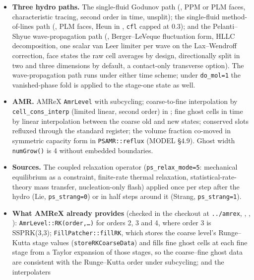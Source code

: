 \documentclass[11pt,a4paper]{article}
\newcommand{\code}[1]{\texttt{\small #1}}
\begin{document}
\begin{itemize}[nosep]
\item \textbf{Three hydro paths.}  The single-fluid Godunov path
      (, PPM or PLM faces, characteristic
      tracing, second order in time, unsplit); the single-fluid
      method-of-lines path (, PLM faces, Heun in
      , \code{cfl} capped at 0.3); and the
      Pelanti--Shyue wave-propagation path (,
      Berger--LeVeque fluctuation form, HLLC decomposition, one scalar
      van Leer limiter per wave on the Lax--Wendroff correction, face
      states the raw cell averages by design, directionally split in two
      and three dimensions by default, a contact-only transverse option).
      The wave-propagation path runs under either time scheme; under
      \code{do\_mol=1} the vanished-phase fold is applied to the stage-one
      state as well.
\item \textbf{AMR.}  AMReX \code{AmrLevel} with subcycling; coarse-to-fine
      interpolation by \code{cell\_cons\_interp} (limited linear, second
      order) in ; fine ghost cells in time by linear
      interpolation between the coarse old and new states; conserved slots
      refluxed through the standard register; the volume fraction co-moved
      in symmetric capacity form in \code{PSAMR::reflux} (MODEL \S4.9).
      Ghost width \code{numGrow()} is 4 without embedded boundaries.
\item \textbf{Sources.}  The coupled relaxation operator
      (\code{ps\_relax\_mode=5}: mechanical equilibrium as a constraint,
      finite-rate thermal relaxation, statistical-rate-theory mass
      transfer, nucleation-only flash) applied once per step after the
      hydro (Lie, \code{ps\_strang=0}) or in half steps around it
      (Strang, \code{ps\_strang=1}).
\item \textbf{What AMReX already provides} (checked in the checkout at
      \code{../amrex}, ,
      ,
      ):
      \code{AmrLevel::RK(order,\dots)} for orders 2, 3 and 4, where order 3
      is SSPRK(3,3); \code{FillPatcher::fillRK}, which stores the coarse
      level's Runge--Kutta stage values (\code{storeRKCoarseData}) and
      fills fine ghost cells at each fine stage from a Taylor expansion of
      those stages, so the coarse--fine ghost data are consistent with the
      Runge--Kutta order under subcycling; and the interpolaters

\end{itemize}
\end{document}
